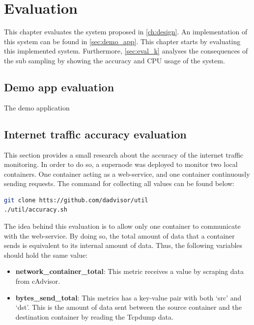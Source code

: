 \chapter{Evaluation}\label{ch:evaluation}
This chapter evaluates the system proposed in \autoref{ch:design}. An implementation of this system can be found in \autoref{sec:demo_app}.  This chapter starts by evaluating this implemented system. Furthermore, \autoref{sec:eval_k} analyses the consequences of the sub sampling by showing the accuracy and CPU usage of the system.

\section{Demo app evaluation} \label{sec:demo_eval}
The demo application 


\section{Internet traffic accuracy evaluation} \label{sec:eval_k}
This section provides a small research about the accuracy of the internet traffic monitoring. In order to do so, a supernode was deployed to monitor two local containers. One container acting as a web-service, and one container continuously sending requests. The command for collecting all values can be found below:

\begin{lstlisting}[language=bash, caption=Docker-compose]
git clone htts://github.com/dadvisor/util
./util/accuracy.sh
\end{lstlisting}

\noindent
The idea behind this evaluation is to allow only one container to communicate with the web-service. By doing so, the total amount of data that a container sends is equivalent to its internal amount of data. Thus, the following variables should hold the same value:
\begin{itemize}
    \item \textbf{network\_container\_total}: This metric receives a value by scraping data from cAdvisor.
    \item \textbf{bytes\_send\_total}: This metrics has a key-value pair with both `src' and `dst'. This is the amount of data sent between the source container and the destination container by reading the Tcpdump data.
\end{itemize}

